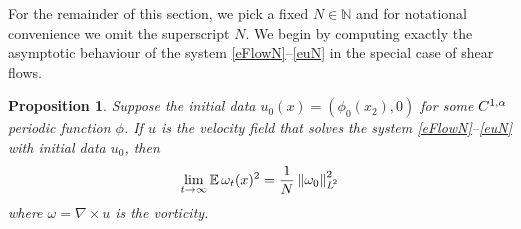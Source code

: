\documentclass[final]{amsart}%
\newcommand{\mceuler}{\eqref{eFlowN}--\eqref{euN}\xspace}
\newcommand{\grad}{\nabla}
\newcommand{\curl}{\grad \times}
\newcommand{\E}{\mathbb{E}}
\newcommand{\N}{\mathbb{N}}
\newcommand{\holderspace}[2]{\ensuremath{C^{\ifx0#1{#2}\else{#1,#2}\fi}}}
\newif\iftextstyle
\newcommand{\norm}[1]{\iftextstyle\lVert#1\rVert\else\left\lVert#1\right\rVert\fi}
\newcommand{\lpnorm}[2]{\norm{#1}_{\smash{L^{\!#2}_{\vphantom{h}}}\vphantom{L^{\!#2}}}}
\numberwithin{equation}{section}
\newtheorem{proposition}[theorem]{Proposition}
\theoremstyle{definition}
\theoremstyle{remark}
\begin{document}
For the remainder of this section, we pick a fixed $N \in \N$ and for notational convenience we omit the superscript $N$. We begin by computing exactly the asymptotic behaviour of the system \mceuler in the special case of shear flows. 

\begin{proposition}\label{propLongTimeOmegaShear}%
Suppose the initial data $u_0(x) = (\phi_0(x_2), 0)$ for some $\holderspace{1}{\alpha}$ periodic function $\phi$. If $u$ is the velocity field that solves the system \mceuler with initial data $u_0$, then
\begin{equation}\label{eqnLongTimeOmegaShear}
\lim_{t \to \infty} \E\,\omega_t(x)^2 = \frac{1}{N} \lpnorm{\omega_0}{2}^2
\end{equation}
where $\omega = \curl u$ is the vorticity.
\end{proposition}%
\end{document}
